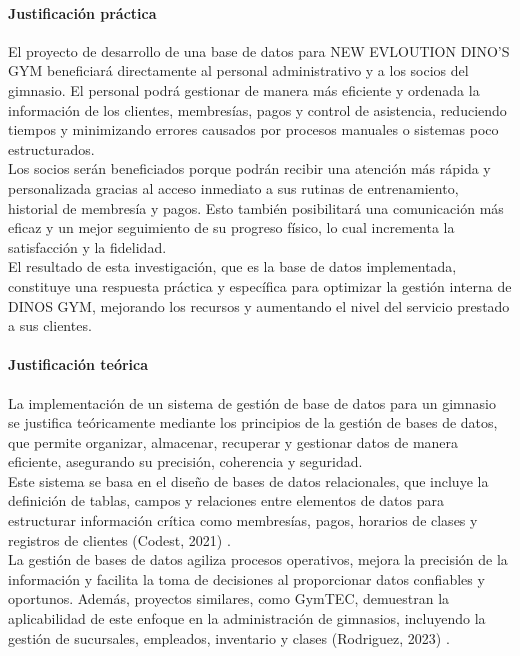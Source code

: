 \documentclass[12pt, letterpaper]{article}
\begin{document}
\paragraph{Justificación práctica}
El proyecto de desarrollo de una base de datos para NEW EVLOUTION DINO'S GYM beneficiará directamente al personal administrativo y a los socios del gimnasio. El personal podrá gestionar de manera más eficiente y ordenada la información de los clientes, membresías, pagos y control de asistencia, reduciendo tiempos y minimizando errores causados por procesos manuales o sistemas poco estructurados.\\
Los socios serán beneficiados porque podrán recibir una atención más rápida y personalizada gracias al acceso inmediato a sus rutinas de entrenamiento, historial de membresía y pagos. Esto también posibilitará una comunicación más eficaz y un mejor seguimiento de su progreso físico, lo cual incrementa la satisfacción y la fidelidad.\\
El resultado de esta investigación, que es la base de datos implementada, constituye una respuesta práctica y específica para optimizar la gestión interna de DINOS GYM, mejorando los recursos y aumentando el nivel del servicio prestado a sus clientes.\\

\paragraph{Justificación teórica}
La implementación de un sistema de gestión de base de datos para un gimnasio se justifica teóricamente mediante los principios de la gestión de bases de datos, que permite organizar, almacenar, recuperar y gestionar datos de manera eficiente, asegurando su precisión, coherencia y seguridad.\\ 
Este sistema se basa en el diseño de bases de datos relacionales, que incluye la definición de tablas, campos y relaciones entre elementos de datos para estructurar información crítica como membresías, pagos, horarios de clases y registros de clientes (Codest, 2021) .\\
La gestión de bases de datos agiliza procesos operativos, mejora la precisión de la información y facilita la toma de decisiones al proporcionar datos confiables y oportunos. Además, proyectos similares, como GymTEC, demuestran la aplicabilidad de este enfoque en la administración de gimnasios, incluyendo la gestión de sucursales, empleados, inventario y clases (Rodriguez, 2023) .  
\end{document}
